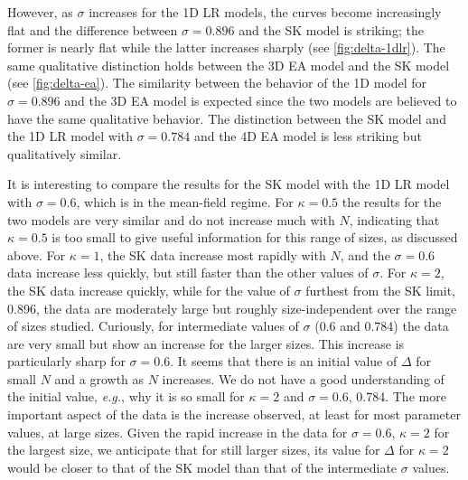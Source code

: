 However, as $\sigma$ increases for the 1D LR models, the curves become
increasingly flat and the difference between $\sigma=0.896$ and the SK model is
striking; the former is nearly flat while the latter increases sharply (see
\cref{fig:delta-1dlr}). The same qualitative distinction holds between the 3D
EA model and the SK model (see \cref{fig:delta-ea}). The similarity between the
behavior of the 1D model for $\sigma=0.896$ and the 3D EA model is expected
since the two models are believed to have the same qualitative behavior.
The distinction between the SK model and the 1D LR model with $\sigma=0.784$
and the 4D EA model is less striking but qualitatively similar.

It is interesting to compare the results for the SK model with the 1D LR model
with $\sigma=0.6$, which is in the mean-field regime. For $\kappa=0.5$ the
results for the two models are very similar and do not increase much with $N$,
indicating that $\kappa=0.5$ is too small to give useful information for this
range of sizes, as discussed above. For $\kappa=1$, the SK data increase most
rapidly with $N$, and the $\sigma=0.6$ data increase less quickly, but still
faster than the other values of $\sigma$. For $\kappa=2$, the SK data increase
quickly, while for the value of $\sigma$ furthest from the SK limit, 0.896, the
data are moderately large but roughly size-independent over the range of sizes
studied. Curiously, for intermediate values of $\sigma$ (0.6 and 0.784) the
data are very small but show an increase for the larger sizes. This increase is
particularly sharp for $\sigma=0.6$. It seems that there is an initial value of
$\Delta$ for small $N$ and a growth as $N$ increases. We do not have a good
understanding of the initial value, \emph{e.g.}, why it is so small for
$\kappa=2$ and $\sigma=0.6$, 0.784. The more important aspect of the data is
the increase observed, at least for most parameter values, at large sizes.
Given the rapid increase in the data for $\sigma=0.6$, $\kappa=2$ for the
largest size, we anticipate that for still larger sizes, its value for $\Delta$
for $\kappa=2$ would be closer to that of the SK model than that of the
intermediate $\sigma$ values.

